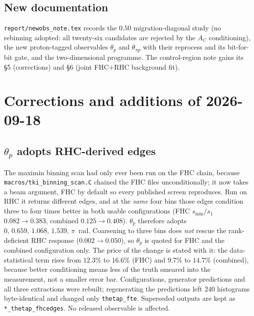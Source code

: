 \subsection{New documentation}
\texttt{report/newobs\_note.tex} records the $0.50$ migration-diagonal study (no rebinning adopted:
all twenty-six candidates are rejected by the $A_C$ conditioning), the new proton-tagged observables
$\theta_p$ and $\theta_{\pi p}$ with their reprocess and its bit-for-bit gate, and the
two-dimensional programme. The control-region note gains its \S5 (corrections) and \S6 (joint
FHC$+$RHC background fit).

\section{Corrections and additions of 2026-09-18}

\subsection{\texorpdfstring{$\theta_p$}{theta p} adopts RHC-derived edges}
\begin{sloppypar}
The maximin binning scan had only ever been run on the FHC chain, because
\texttt{macros/tki\_binning\_scan.C} chained the FHC files unconditionally; it now takes a beam
argument, FHC by default so every published screen reproduces. Run on RHC it returns different edges,
and at the \emph{same} four bins those edges condition three to four times better in both usable
configurations (FHC $s_{\min}/s_1$ $0.082\to0.383$, combined $0.125\to0.408$). $\theta_p$ therefore
adopts $0,\,0.659,\,1.068,\,1.539,\,\pi$~rad. Coarsening to three bins does \emph{not} rescue the
rank-deficient RHC response ($0.002\to0.050$), so $\theta_p$ is quoted for FHC and the combined
configuration only. The price of the change is stated with it: the data-statistical term rises from
$12.3\%$ to $16.6\%$ (FHC) and $9.7\%$ to $14.7\%$ (combined), because better conditioning means
less of the truth smeared into the measurement, not a smaller error bar. Configurations, generator
predictions and all three extractions were rebuilt; regenerating the predictions left $240$
histograms byte-identical and changed only \texttt{thetap\_fte}. Superseded outputs are kept as
\texttt{*\_thetap\_fhcedges}. No released observable is affected.
\end{sloppypar}

